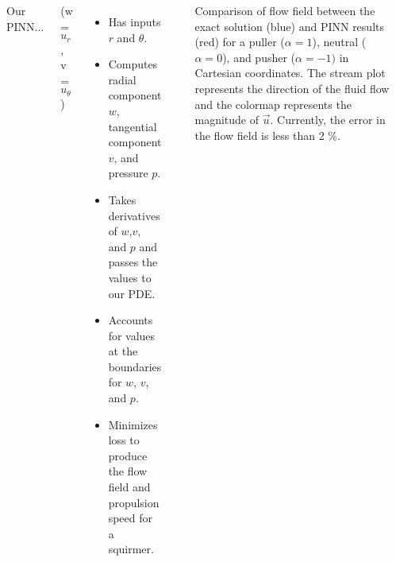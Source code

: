 \documentclass[25pt, a0paper, landscape, blockverticalspace=1cm]{tikzposter}
\begin{document}
\begin{columns}


{

\begin{center}
    \label{fig:PINN_diagram}

\end{center}

Our PINN...

(w = $u_r$, v = $u_{\theta}$)
\begin{itemize}
    \item Has inputs $r$ and $\theta$.
    \item Computes radial component $w$, tangential component $v$, and pressure $p$.
    \item Takes derivatives of $w$,$v$, and $p$ and passes the values to our PDE.
    \item Accounts for values at the boundaries for $w$, $v$, and $p$.
    \item Minimizes loss to produce the flow field and propulsion speed for a squirmer.
\end{itemize}

}





{

\begin{center}
\end{center}

    Comparison of flow field between the exact solution (blue) and PINN results (red) for a puller ($\alpha = 1$), neutral ($\alpha = 0$), and pusher ($\alpha = -1)$ in Cartesian coordinates. The stream plot represents the direction of the fluid flow and the colormap represents the magnitude of $\vec{u}.$ Currently, the error in the flow field is less than 2 \%. 

}
\end{columns}
\end{document}
